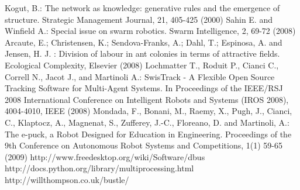 \documentclass{llncs}
\begin{document}
\begin{thebibliography}{}
Kogut, B.: 
The network as knowledge: generative rules and the emergence of structure. 
Strategic Management Journal, 21, 405-425 (2000)
Sahin E. and Winfield A.: 
Special issue on swarm robotics.
Swarm Intelligence, 2, 69-72 (2008)
Arcaute, E.; Christensen, K.; Sendova-Franks, A.; Dahl, T.; Espinosa, A. and Jensen, H. J. : 
Division of labour in ant colonies in terms of attractive fields. 
Ecological Complexity, Elsevier (2008)
Lochmatter T., Roduit P., Cianci C., Correll N., Jacot J., and Martinoli A.: 
SwisTrack - A Flexible Open Source Tracking Software for Multi-Agent Systems. 
In Proceedings of the IEEE/RSJ 2008 International Conference on Intelligent Robots and Systems (IROS 2008), 4004-4010, IEEE (2008)
Mondada, F., Bonani, M., Raemy, X., Pugh, J., Cianci, C., Klaptocz, A., Magnenat, S., Zufferey, J.-C., Floreano, D. and Martinoli, A.:
The e-puck, a Robot Designed for Education in Engineering. 
Proceedings of the 9th Conference on Autonomous Robot Systems and Competitions, 1(1) 59-65 (2009) 
http://www.freedesktop.org/wiki/Software/dbus
http://docs.python.org/library/multiprocessing.html
http://willthompson.co.uk/bustle/
\end{thebibliography}
%
\end{document}
